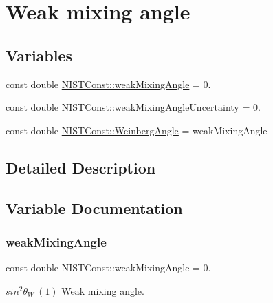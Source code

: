 \hypertarget{group___weak_mixing_angle}{}\section{Weak mixing angle}
\label{group___weak_mixing_angle}
\subsection*{Variables}
\begin{DoxyCompactItemize}
\item 
const double \hyperlink{group___weak_mixing_angle_gaf4037fe32df08c9c7eccd8487b5eab34}{N\+I\+S\+T\+Const\+::weak\+Mixing\+Angle} = 0.
\item 
const double \hyperlink{group___weak_mixing_angle_ga6b461a8ed9af6322050586b5919cda98}{N\+I\+S\+T\+Const\+::weak\+Mixing\+Angle\+Uncertainty} = 0.
\item 
const double \hyperlink{group___weak_mixing_angle_gaa27d3628b9e064d9d8d998be81b6adf0}{N\+I\+S\+T\+Const\+::\+Weinberg\+Angle} = weak\+Mixing\+Angle
\end{DoxyCompactItemize}


\subsection{Detailed Description}


\subsection{Variable Documentation}
\mbox{\label{group___weak_mixing_angle_gaf4037fe32df08c9c7eccd8487b5eab34}} 
\subsubsection{\texorpdfstring{weak\+Mixing\+Angle}{weakMixingAngle}}
{\footnotesize\ttfamily const double N\+I\+S\+T\+Const\+::weak\+Mixing\+Angle = 0.}

$sin^2 \theta_W \ (1)$ Weak mixing angle. \mbox{\label{group___weak_mixing_angle_ga6b461a8ed9af6322050586b5919cda98}} 
